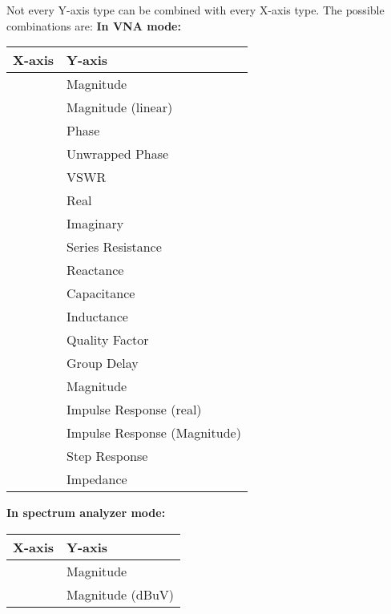 \documentclass[a4paper,11pt]{article}
\begin{document}
Not every Y-axis type can be combined with every X-axis type. The possible combinations are:
\textbf{In VNA mode:}
\begin{center}
\begin{threeparttable}
\begin{tabularx}{9cm}{L{3cm}|X}
    \toprule
    \textbf{X-axis} & \textbf{Y-axis} \\
     \hline
        	&    Magnitude\\ 
        	&    Magnitude (linear)\\ 
        	&   Phase \\ 
        	&   Unwrapped Phase \\ 
        	&    VSWR\\ 
        	&    Real\\ 
        	&    Imaginary\\ 
        	&    Series Resistance\\ 
        	&    Reactance\\ 
        	&    Capacitance\\ 
        	&   Inductance \\ 
        	&    Quality Factor\\ 
        	&    Group Delay\\ 
    \hline
        	&    Magnitude\\ 
        	&    Impulse Response (real)\\ 
        	&   Impulse Response (Magnitude) \\ 
        	&   Step Response \\ 
        	&    Impedance\\ 
      \bottomrule
\end{tabularx}
\end{threeparttable}
\end{center}
\textbf{In spectrum analyzer mode:}
\begin{center}
\begin{threeparttable}
\begin{tabularx}{9cm}{L{3cm}|X}
    \toprule
    \textbf{X-axis} & \textbf{Y-axis} \\
     \hline
        	&    Magnitude\\ 
        	&    Magnitude (dBuV)\\ 
      \bottomrule
\end{tabularx}
\end{threeparttable}
\end{center}
\end{document}
